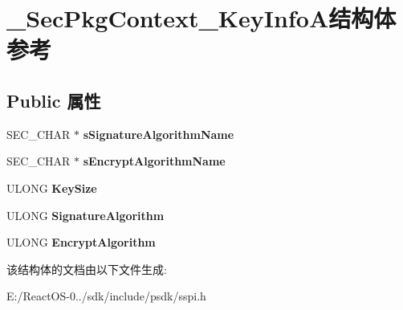 \hypertarget{struct___sec_pkg_context___key_info_a}{}\section{\+\_\+\+Sec\+Pkg\+Context\+\_\+\+Key\+Info\+A结构体 参考}
\label{struct___sec_pkg_context___key_info_a}
\subsection*{Public 属性}
\begin{DoxyCompactItemize}
\item 
\mbox{\label{struct___sec_pkg_context___key_info_a_ae9854e57af5ade8b92e76176224af41d}} 
S\+E\+C\+\_\+\+C\+H\+AR $\ast$ {\bfseries s\+Signature\+Algorithm\+Name}
\item 
\mbox{\label{struct___sec_pkg_context___key_info_a_aa6e5f9c84a8173c55e2974f8c220fa5e}} 
S\+E\+C\+\_\+\+C\+H\+AR $\ast$ {\bfseries s\+Encrypt\+Algorithm\+Name}
\item 
\mbox{\label{struct___sec_pkg_context___key_info_a_a694443ab0bb39f1376f02774f03d7b8f}} 
U\+L\+O\+NG {\bfseries Key\+Size}
\item 
\mbox{\label{struct___sec_pkg_context___key_info_a_a45fee9fc8d314ba36915c931f9ebfebe}} 
U\+L\+O\+NG {\bfseries Signature\+Algorithm}
\item 
\mbox{\label{struct___sec_pkg_context___key_info_a_af9f5f433473d6075f49e1ee31f73532a}} 
U\+L\+O\+NG {\bfseries Encrypt\+Algorithm}
\end{DoxyCompactItemize}


该结构体的文档由以下文件生成\+:\begin{DoxyCompactItemize}
\item 
E\+:/\+React\+O\+S-\/0../sdk/include/psdk/sspi.\+h\end{DoxyCompactItemize}
